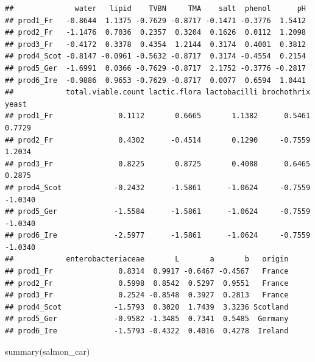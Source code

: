 \documentclass[
]{book}
\newenvironment{Shaded}{\begin{snugshade}}{\end{snugshade}}
\newcommand{\FunctionTok}[1]{\textcolor[rgb]{0.00,0.00,0.00}{#1}}
\newcommand{\NormalTok}[1]{#1}
\begin{document}
\begin{verbatim}
##              water   lipid    TVBN     TMA    salt  phenol      pH
## prod1_Fr   -0.8644  1.1375 -0.7629 -0.8717 -0.1471 -0.3776  1.5412
## prod2_Fr   -1.1476  0.7036  0.2357  0.3204  0.1626  0.0112  1.2098
## prod3_Fr   -0.4172  0.3378  0.4354  1.2144  0.3174  0.4001  0.3812
## prod4_Scot -0.8147 -0.0961 -0.5632 -0.8717  0.3174 -0.4554  0.2154
## prod5_Ger  -1.6991  0.0366 -0.7629 -0.8717  2.1752 -0.3776 -0.2817
## prod6_Ire  -0.9886  0.9653 -0.7629 -0.8717  0.0077  0.6594  1.0441
##            total.viable.count lactic.flora lactobacilli brochothrix   yeast
## prod1_Fr               0.1112       0.6665       1.1382      0.5461  0.7729
## prod2_Fr               0.4302      -0.4514       0.1290     -0.7559  1.2034
## prod3_Fr               0.8225       0.8725       0.4088      0.6465  0.2875
## prod4_Scot            -0.2432      -1.5861      -1.0624     -0.7559 -1.0340
## prod5_Ger             -1.5584      -1.5861      -1.0624     -0.7559 -1.0340
## prod6_Ire             -2.5977      -1.5861      -1.0624     -0.7559 -1.0340
##            enterobacteriaceae       L       a       b   origin
## prod1_Fr               0.8314  0.9917 -0.6467 -0.4567   France
## prod2_Fr               0.5998  0.8542  0.5297  0.9551   France
## prod3_Fr               0.2524 -0.8548  0.3927  0.2813   France
## prod4_Scot            -1.5793  0.3020  1.7439  3.3236 Scotland
## prod5_Ger             -0.9582 -1.3485  0.7341  0.5485  Germany
## prod6_Ire             -1.5793 -0.4322  0.4016  0.4278  Ireland
\end{verbatim}

\begin{Shaded}
\begin{Highlighting}[]
\FunctionTok{summary}\NormalTok{(salmon\_car)}
\end{Highlighting}
\end{Shaded}
\end{document}

